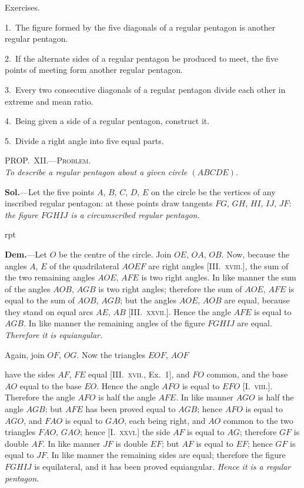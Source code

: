 \documentclass[oneside]{book}
\newcounter{wrapwidth}
\newcommand\myprop[2]{
\bigskip\Needspace*{4\baselineskip}\begin{center}\textsc{#1}\\\medskip\emph{#2}\par\end{center}
}
\newcommand\exhead[1]{
\Needspace*{5\baselineskip}\begin{center}
\textsf{#1}
\end{center}
}
\newcommand\imgflow[3]{
\setcounter{wrapwidth}{#1}

\begin{wrapfigure}[#2]{r}{\value{wrapwidth}pt}
\begin{center}
\vspace{-0.3in}

\end{center}
\end{wrapfigure}
}
\begin{document}
\exhead{Exercises.}

\begin{footnotesize}
1.~The figure formed by the five diagonals of a regular pentagon
is another regular pentagon.

2.~If the alternate sides of a regular pentagon be produced to
meet, the five points of meeting form another regular pentagon.

3.~Every two consecutive diagonals of a regular pentagon
divide each other in extreme and mean ratio.

4.~Being given a side of a regular pentagon, construct it.

5.~Divide a right angle into five equal parts.
\par\end{footnotesize}

\myprop{PROP\@.~XII\@.---Problem.}{To describe a regular pentagon about a given circle $(ABCDE)$.}

\textbf{Sol.}---Let the five points $A$, $B$, $C$, $D$, $E$ on the circle
be the vertices of any inscribed regular pentagon: at
these points draw tangents $FG$, $GH$, $HI$, $IJ$, $JF$: \emph{the
figure $FGHIJ$ is a circumscribed regular pentagon.}


\imgflow{140}{12}{f164}

\textbf{Dem.}---Let $O$ be the centre of the circle. Join $OE$,
$OA$, $OB$. Now, because the
angles $A$, $E$ of the quadrilateral
$AOEF$ are right angles
[III\@.~\textsc{xviii.}], the sum of the
two remaining angles $AOE$,
$AFE$ is two right angles. In
like manner the sum of the
angles $AOB$, $AGB$ is two
right angles; therefore the
sum of $AOE$, $AFE$ is equal
to the sum of $AOB$, $AGB$;
but the angles $AOE$, $AOB$ are equal, because they
stand on equal arcs $AE$, $AB$ [III\@.~\textsc{xxvii.}]. Hence the
angle $AFE$ is equal to $AGB$. In like manner the
remaining angles of the figure $FGHIJ$ are equal.
\emph{Therefore it is equiangular.}

Again, join $OF$, $OG$. Now the triangles $EOF$, $AOF$

have the sides $AF$, $FE$ equal [III\@.~\textsc{xvii.}, Ex.~1], and $FO$
common, and the base $AO$ equal to the base $EO$. Hence
the angle $AFO$ is equal to $EFO$ [I.~\textsc{viii.}]. Therefore
the angle $AFO$ is half the angle $AFE$. In like manner
$AGO$ is half the angle $AGB$; but $AFE$ has been
proved equal to $AGB$; hence $AFO$ is equal to $AGO$,
and $FAO$ is equal to $GAO$, each being right, and $AO$
common to the two triangles $FAO$, $GAO$; hence
[I.~\textsc{xxvi.}] the side $AF$ is equal to $AG$; therefore $GF$ is
double $AF$. In like manner $JF$ is double $EF$; but $AF$
is equal to $EF$; hence $GF$ is equal to $JF$. In like
manner the remaining sides are equal; therefore the
figure $FGHIJ$ is equilateral, and it has been proved
equiangular. \emph{Hence it is a regular pentagon.}\par\smallskip
\end{document}
